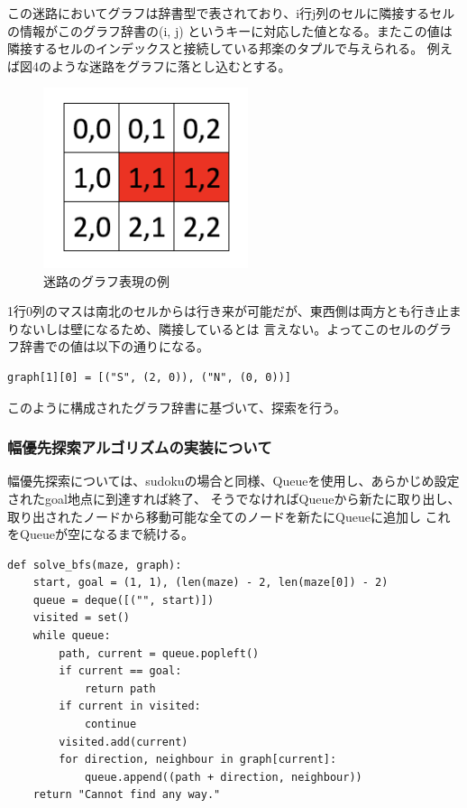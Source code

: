 \documentclass[uplatex]{jsarticle}
\begin{document}
この迷路においてグラフは辞書型で表されており、i行j列のセルに隣接するセルの情報がこのグラフ辞書の(i, j)
というキーに対応した値となる。またこの値は隣接するセルのインデックスと接続している邦楽のタプルで与えられる。
例えば図4のような迷路をグラフに落とし込むとする。
\begin{figure}
  \begin{center}
    \includegraphics[width=6cm]{img/maze_graph.png}
    \caption{迷路のグラフ表現の例}
  \end{center}
\end{figure}
1行0列のマスは南北のセルからは行き来が可能だが、東西側は両方とも行き止まりないしは壁になるため、隣接しているとは
言えない。よってこのセルのグラフ辞書での値は以下の通りになる。
\begin{lstlisting}[basicstyle=\ttfamily\footnotesize, frame=single]
  graph[1][0] = [("S", (2, 0)), ("N", (0, 0))]
\end{lstlisting}
このように構成されたグラフ辞書に基づいて、探索を行う。

\subsubsection{幅優先探索アルゴリズムの実装について}
幅優先探索については、sudokuの場合と同様、Queueを使用し、あらかじめ設定されたgoal地点に到達すれば終了、
そうでなければQueueから新たに取り出し、取り出されたノードから移動可能な全てのノードを新たにQueueに追加し
これをQueueが空になるまで続ける。

\begin{lstlisting}[basicstyle=\ttfamily\footnotesize, frame=single]
def solve_bfs(maze, graph):
    start, goal = (1, 1), (len(maze) - 2, len(maze[0]) - 2)
    queue = deque([("", start)])
    visited = set()
    while queue:
        path, current = queue.popleft()
        if current == goal:
            return path
        if current in visited:
            continue
        visited.add(current)
        for direction, neighbour in graph[current]:
            queue.append((path + direction, neighbour))
    return "Cannot find any way."

\end{lstlisting}
\end{document}
